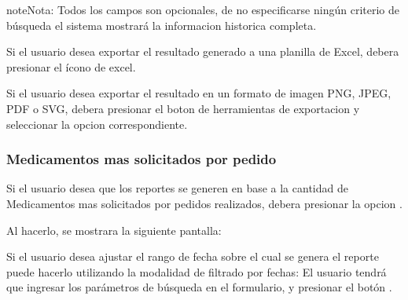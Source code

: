 \documentclass[a4paper,10pt,spanish]{sphinxmanual}
\begin{document}
\begin{notice}{note}{Nota:}
Todos los campos son opcionales, de no especificarse ningún criterio de búsqueda el sistema mostrará la informacion historica completa.
\end{notice}


Si el usuario desea exportar el resultado generado a una planilla de Excel, debera presionar el ícono de excel.


Si el usuario desea exportar el resultado en un formato de imagen PNG, JPEG, PDF o SVG, debera presionar el boton de herramientas de exportacion y seleccionar la opcion correspondiente.



\subsubsection{Medicamentos mas solicitados por pedido}
\label{medicams:medicamentos-mas-solicitados-por-pedido}\label{medicams:meds-ped-pc}
Si el usuario desea que los reportes se generen en base a la cantidad de Medicamentos mas solicitados por pedidos realizados, debera presionar la opcion .


Al hacerlo, se mostrara la siguiente pantalla:



Si el usuario desea ajustar el rango de fecha sobre el cual se genera el reporte puede hacerlo utilizando la modalidad de filtrado por fechas:
El usuario tendrá que ingresar los parámetros de búsqueda en el formulario, y presionar el botón .
\end{document}
